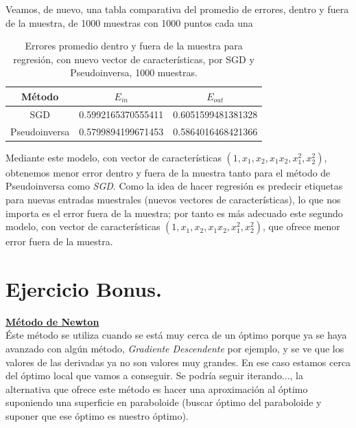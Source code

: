 \documentclass[11pt,a4paper]{article}
\theoremstyle{definition}
\begin{document}
	Veamos, de nuevo, una tabla comparativa del promedio de errores, dentro y fuera de la muestra, de 1000 muestras con 1000 puntos cada una
	\begin{table}[htbp]
	\begin{center}
	\begin{tabular}{|c|c|c|}
	\hline
	Método & $E_{in}$ & $E_{out}$ \\
	\hline \hline
	SGD & 0.5992165370555411 & 0.6051599481381328\\ \hline
	Pseudoinversa & 0.5799894199671453 & 0.5864016468421366\\ \hline
	\end{tabular}
	\caption{Errores promedio dentro y fuera de la muestra para regresión, con nuevo vector de características, por SGD y Pseudoinversa, 1000 muestras.}
	\label{tabla:sencilla}
	\end{center}
	\end{table}
	
	Mediante este modelo, con vector de características $(1,x_1,x_2,x_1x_2,x_1^2,x_2^2)$, obtenemos menor error dentro y fuera de la muestra tanto para el método de Pseudoinversa como \textit{SGD}. Como la idea de hacer regresión es predecir etiquetas para nuevas entradas muestrales (nuevos vectores de características), lo que nos importa es el error fuera de la muestra; por tanto es más adecuado este segundo modelo, con vector de características $(1,x_1,x_2,x_1x_2,x_1^2,x_2^2)$, que ofrece menor error fuera de la muestra.
	
	\section{Ejercicio Bonus.}
	\underline{\bf Método de Newton}\\
	
		Éste método se utiliza cuando se está muy cerca de un óptimo porque ya se haya avanzado con algún método, \textit{Gradiente Descendente} por ejemplo, y se ve que los valores de las derivadas ya no son valores muy grandes. En ese caso estamos cerca del óptimo local que vamos a conseguir. Se podría seguir iterando..., la alternativa que ofrece este método es hacer una aproximación al óptimo suponiendo una superficie en paraboloide (buscar óptimo del paraboloide y suponer que ese óptimo es nuestro óptimo).\\
	
\end{document}
